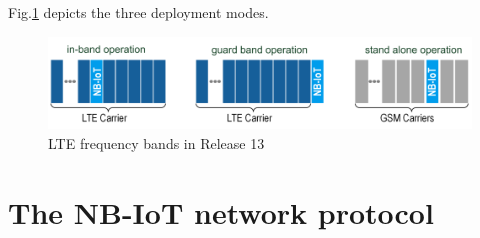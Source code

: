 Fig.\ref{fig:nb-iot-modes} depicts the three deployment modes.
\begin{figure}[h!]
    \centering
    \includegraphics[width=\textwidth]{pict/nb-iot-modes.png}
    \caption{LTE frequency bands in Release 13 \cite{NB_IoT-rohde}}
    \label{fig:nb-iot-modes}
\end{figure}

\section{The NB-IoT network protocol}

